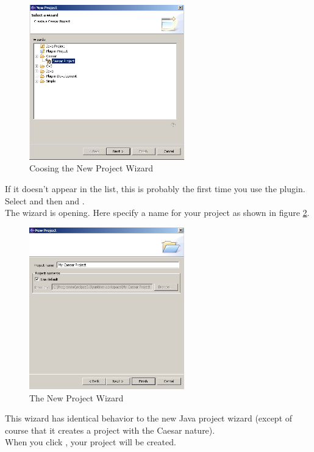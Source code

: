 \begin{figure}[htbp]
	\centering
		\includegraphics[width=0.60\textwidth]{images/project_wizard.png}
	\caption{Coosing the New Project Wizard}
	\label{fig:project_wizard}
\end{figure}

If it doesn't appear in the list, this is probably the first time you use the plugin. Select  and then  and .\\
The wizard is opening. Here specify a name for your project as shown in figure \ref{fig:project_wizard2}.

\begin{figure}[htbp]
	\centering
		\includegraphics[width=0.60\textwidth]{images/project_wizard2.png}
	\caption{The New Project Wizard}
	\label{fig:project_wizard2}
\end{figure}

This wizard has identical behavior to the new Java project wizard (except of course that
it creates a project with the Caesar nature).\\
When you click , your project will be created.